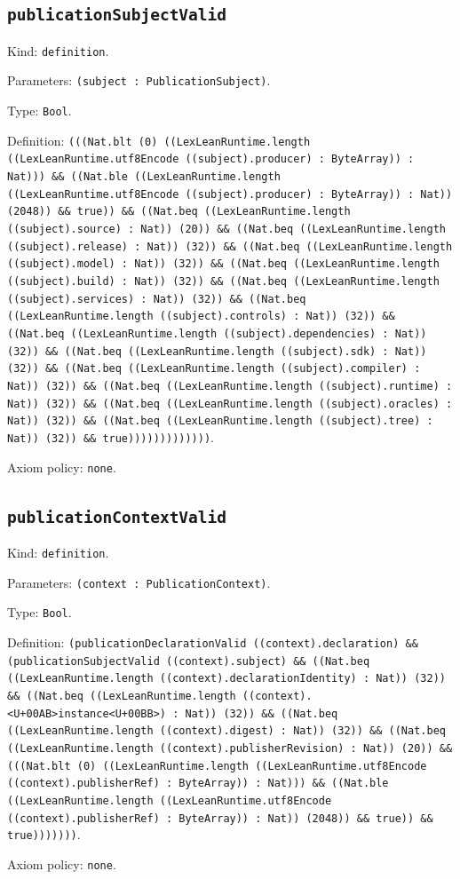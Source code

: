 \documentclass[11pt]{article}
\begin{document}
\subsection*{\texttt{publicationSubjectValid}}
\noindent Kind: \texttt{definition}.\par
\noindent Parameters: \texttt{(subject : PublicationSubject)}.\par
\noindent Type: \texttt{Bool}.\par
\noindent Definition: \texttt{(((Nat.blt (0) ((LexLeanRuntime.length ((LexLeanRuntime.utf8Encode ((subject).producer) : ByteArray)) : Nat))) \&\& ((Nat.ble ((LexLeanRuntime.length ((LexLeanRuntime.utf8Encode ((subject).producer) : ByteArray)) : Nat)) (2048)) \&\& true)) \&\& ((Nat.beq ((LexLeanRuntime.length ((subject).source) : Nat)) (20)) \&\& ((Nat.beq ((LexLeanRuntime.length ((subject).release) : Nat)) (32)) \&\& ((Nat.beq ((LexLeanRuntime.length ((subject).model) : Nat)) (32)) \&\& ((Nat.beq ((LexLeanRuntime.length ((subject).build) : Nat)) (32)) \&\& ((Nat.beq ((LexLeanRuntime.length ((subject).services) : Nat)) (32)) \&\& ((Nat.beq ((LexLeanRuntime.length ((subject).controls) : Nat)) (32)) \&\& ((Nat.beq ((LexLeanRuntime.length ((subject).dependencies) : Nat)) (32)) \&\& ((Nat.beq ((LexLeanRuntime.length ((subject).sdk) : Nat)) (32)) \&\& ((Nat.beq ((LexLeanRuntime.length ((subject).compiler) : Nat)) (32)) \&\& ((Nat.beq ((LexLeanRuntime.length ((subject).runtime) : Nat)) (32)) \&\& ((Nat.beq ((LexLeanRuntime.length ((subject).oracles) : Nat)) (32)) \&\& ((Nat.beq ((LexLeanRuntime.length ((subject).tree) : Nat)) (32)) \&\& true)))))))))))))}.\par
\noindent Axiom policy: \texttt{none}.\par
\subsection*{\texttt{publicationContextValid}}
\noindent Kind: \texttt{definition}.\par
\noindent Parameters: \texttt{(context : PublicationContext)}.\par
\noindent Type: \texttt{Bool}.\par
\noindent Definition: \texttt{(publicationDeclarationValid ((context).declaration) \&\& (publicationSubjectValid ((context).subject) \&\& ((Nat.beq ((LexLeanRuntime.length ((context).declarationIdentity) : Nat)) (32)) \&\& ((Nat.beq ((LexLeanRuntime.length ((context).<U+00AB>instance<U+00BB>) : Nat)) (32)) \&\& ((Nat.beq ((LexLeanRuntime.length ((context).digest) : Nat)) (32)) \&\& ((Nat.beq ((LexLeanRuntime.length ((context).publisherRevision) : Nat)) (20)) \&\& (((Nat.blt (0) ((LexLeanRuntime.length ((LexLeanRuntime.utf8Encode ((context).publisherRef) : ByteArray)) : Nat))) \&\& ((Nat.ble ((LexLeanRuntime.length ((LexLeanRuntime.utf8Encode ((context).publisherRef) : ByteArray)) : Nat)) (2048)) \&\& true)) \&\& true)))))))}.\par
\noindent Axiom policy: \texttt{none}.\par
\end{document}
